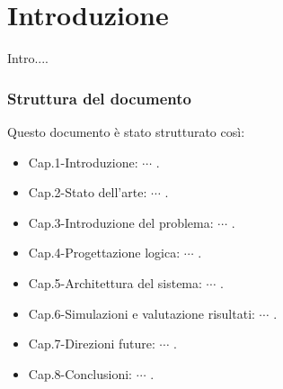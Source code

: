 \chapter{Introduzione}
\label{chap:Introduzione}

Intro....

\subsection{Struttura del documento}
Questo documento è stato strutturato così:
\begin{itemize}
	\item Cap.1-Introduzione: $\cdots$ .
	\item Cap.2-Stato dell'arte: $\cdots$ .
	\item Cap.3-Introduzione del problema: $\cdots$ .
	\item Cap.4-Progettazione logica: $\cdots$ .
	\item Cap.5-Architettura del sistema: $\cdots$ .
	\item Cap.6-Simulazioni e valutazione risultati: $\cdots$ .
	\item Cap.7-Direzioni future: $\cdots$ .
	\item Cap.8-Conclusioni: $\cdots$ .
\end{itemize}